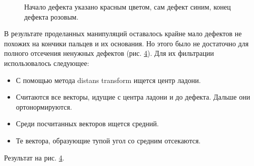 \documentclass[12pt,fleqn]{article}
\begin{document}
\begin{figure}[h]
\caption{Начало дефекта указано красным цветом, сам дефект синим, конец дефекта розовым.}
\label{Image3}
\end{figure}

В результате проделанных манипуляций оставалось крайне мало дефектов не похожих на кончики пальцев и их основания. Но этого было не достаточно для полного отсечения ненужных дефектов (рис. \hyperref[Image4]{4}). Для их фильтрации использовалось следующее:

\begin{itemize}
\item С помощью метода distans transform ищется центр ладони.
\item Считаются все векторы, идущие с центра ладони и до дефекта. Дальше они ортонормируются.
\item Среди посчитанных векторов ищется средний.
\item Те вектора, образующие тупой угол со средним отсекаются.
\end{itemize}

Результат на рис. \hyperref[Image4]{4}.
\end{document}
